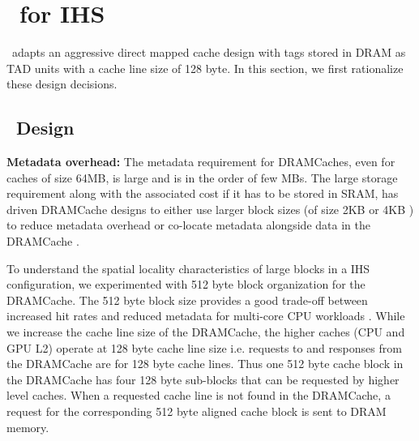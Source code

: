 \section{\cachename\ for IHS} \label{design+mechanism}
\cachename\ adapts an aggressive direct mapped cache design with tags stored in DRAM as TAD units \cite{alloy} with a cache line size of 128 byte. In this section, we first rationalize these design decisions.

\subsection{\cachename\ Design} \label{design}

\par \textbf{Metadata overhead:} The metadata requirement for DRAMCaches, even for caches of size 64MB, is large and is in the order of few MBs. The large storage requirement along with the associated cost if it has to be stored in SRAM, has driven DRAMCache designs to either use larger block sizes (of size 2KB or 4KB \cite{footprint,unison-cache}) to reduce metadata overhead or co-locate metadata alongside data in the DRAMCache \cite{loh-hill,alloy,atcache}. 
\par To understand the spatial locality characteristics of large blocks in a IHS configuration, we experimented with 512 byte block organization for the DRAMCache. 
The 512 byte block size provides a good trade-off between increased hit rates and reduced metadata for multi-core CPU workloads \cite{bimodal}. While we increase the cache line size of the DRAMCache, the higher caches (CPU and GPU L2) operate at 128 byte cache line size i.e. requests to and responses from the DRAMCache are for 128 byte cache lines. Thus one 512 byte cache block in the DRAMCache has four 128 byte sub-blocks that can be requested by higher level caches. When a requested cache line is not found in the DRAMCache, a request for the corresponding 512 byte aligned cache block is sent to DRAM memory.

